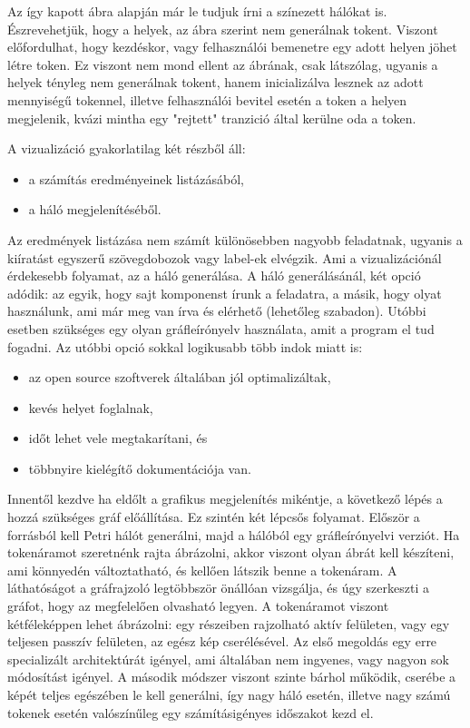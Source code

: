 Az így kapott ábra alapján már le tudjuk írni a színezett hálókat is. Észrevehetjük, hogy a helyek, az ábra szerint nem generálnak tokent. Viszont előfordulhat, hogy kezdéskor, vagy felhasználói bemenetre egy adott helyen jöhet létre token. Ez viszont nem mond ellent az ábrának, csak látszólag, ugyanis a helyek tényleg nem generálnak tokent, hanem inicializálva lesznek az adott mennyiségű tokennel, illetve felhasználói bevitel esetén a token a helyen megjelenik, kvázi mintha egy "rejtett" tranzició által kerülne oda a token. 

A vizualizáció gyakorlatilag két részből áll:
\begin{itemize}
\item a számítás eredményeinek listázásából,
\item a háló megjelenítéséből. 
\end{itemize}
Az eredmények listázása nem számít különösebben nagyobb feladatnak, ugyanis a kiíratást egyszerű szövegdobozok vagy label-ek elvégzik. Ami a vizualizációnál érdekesebb folyamat, az a háló generálása. 
A háló generálásánál, két opció adódik: az egyik, hogy sajt komponenst írunk a feladatra, a másik, hogy olyat használunk, ami már meg van írva és elérhető (lehetőleg szabadon). Utóbbi esetben szükséges egy olyan gráfleírónyelv használata, amit a program el tud fogadni. Az utóbbi opció sokkal logikusabb több indok miatt is:
\begin{itemize}
\item az open source szoftverek általában jól optimalizáltak,
\item kevés helyet foglalnak,
\item időt lehet vele megtakarítani, és
\item többnyire kielégítő dokumentációja van.
\end{itemize}

Innentől kezdve ha eldőlt a grafikus megjelenítés mikéntje, a következő lépés a hozzá szükséges gráf előállítása. Ez szintén két lépcsős folyamat. Először a forrásból kell Petri hálót generálni, majd a hálóból egy gráfleírónyelvi verziót. Ha tokenáramot szeretnénk rajta ábrázolni, akkor viszont olyan ábrát kell készíteni, ami könnyedén változtatható, és kellően látszik benne a tokenáram. A láthatóságot a gráfrajzoló legtöbbször önállóan vizsgálja, és úgy szerkeszti a gráfot, hogy az megfelelően olvasható legyen. A tokenáramot viszont kétféleképpen lehet ábrázolni: egy részeiben rajzolható aktív felületen, vagy egy teljesen passzív felületen, az egész kép cserélésével. Az első megoldás egy erre specializált architektúrát igényel, ami általában nem ingyenes, vagy nagyon sok módosítást igényel. A második módszer viszont szinte bárhol működik, cserébe a képét teljes egészében le kell generálni, így nagy háló esetén, illetve nagy számú tokenek esetén valószínűleg egy számításigényes időszakot kezd el. 


